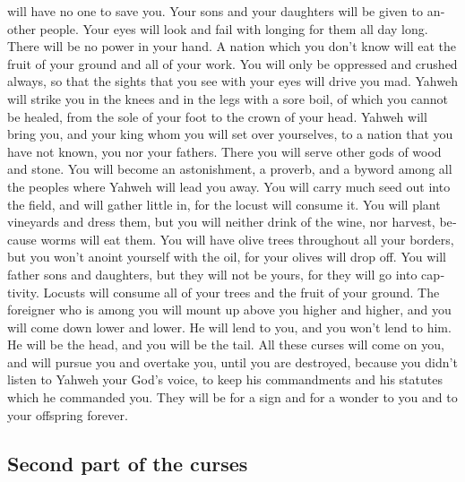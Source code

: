 \begin{paracol}{2}
\begin{otherlanguage}{english}
will have no one to save you.  Your sons and your
daughters will be given to another people. Your eyes will look and fail
with longing for them all day long. There will be no power in your hand.
 A nation which you don't know will eat the fruit of your
ground and all of your work. You will only be oppressed and crushed
always,  so that the sights that you see with your eyes
will drive you mad.  Yahweh will strike you in the knees
and in the legs with a sore boil, of which you cannot be healed, from
the sole of your foot to the crown of your head.  Yahweh
will bring you, and your king whom you will set over yourselves, to a
nation that you have not known, you nor your fathers. There you will
serve other gods of wood and stone.  You will become an
astonishment, a proverb, and a byword among all the peoples where Yahweh
will lead you away.  You will carry much seed out into
the field, and will gather little in, for the locust will consume it.
 You will plant vineyards and dress them, but you will
neither drink of the wine, nor harvest, because worms will eat them.
 You will have olive trees throughout all your borders,
but you won't anoint yourself with the oil, for your olives will drop
off.  You will father sons and daughters, but they will
not be yours, for they will go into captivity.  Locusts
will consume all of your trees and the fruit of your ground.
 The foreigner who is among you will mount up above you
higher and higher, and you will come down lower and lower.
 He will lend to you, and you won't lend to him. He will
be the head, and you will be the tail.  All these curses
will come on you, and will pursue you and overtake you, until you are
destroyed, because you didn't listen to Yahweh your God's voice, to keep
his commandments and his statutes which he commanded you.
 They will be for a sign and for a wonder to you and to
your offspring forever.

\hypertarget{second-part-of-the-curses}{%
\subsection{Second part of the curses}\label{second-part-of-the-curses}}


\end{otherlanguage}
\end{paracol}
